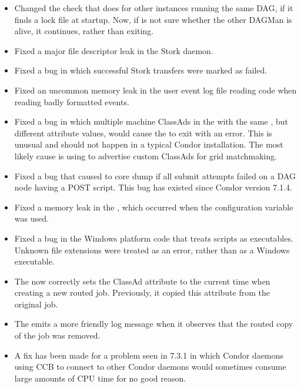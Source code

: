 \begin{itemize}
\item Changed the check that  does for other
 instances
running the same DAG, if it finds a lock file at startup.
Now, if  is not sure whether the other DAGMan is alive,
it continues, rather than exiting.

\item Fixed a major file descriptor leak in the Stork daemon.

\item Fixed a bug in which successful Stork transfers were marked as failed.

\item Fixed an uncommon memory leak in the user event log file reading code
when reading badly formatted events.

\item Fixed a bug in which multiple machine ClassAds in the
 with the same ,
but different  attribute values,
would cause the  to exit with an error.
This is unusual and should not happen in a typical Condor installation.
The most likely cause is using 
to advertise custom ClassAds for grid matchmaking.

\item Fixed a bug that caused  to core dump if all
submit attempts failed on a DAG node having a POST script.
This bug has existed since Condor version 7.1.4.

\item Fixed a memory leak in the , which occurred when
the configuration variable  was used.

\item Fixed a bug in the Windows platform code that treats scripts as
  executables.
  Unknown file extensions were treated as an error,
  rather than as a Windows executable.

\item The  now correctly sets the ClassAd attribute
 to the current time when creating a new routed job.
Previously, it copied this attribute from the original job.

\item The  emits a more friendly log message when it
observes that the routed copy of the job was removed.

\item A fix has been made for a problem seen in 7.3.1 in which Condor daemons
using CCB to connect to other Condor daemons would sometimes consume
large amounts of CPU time for no good reason.


\end{itemize}
